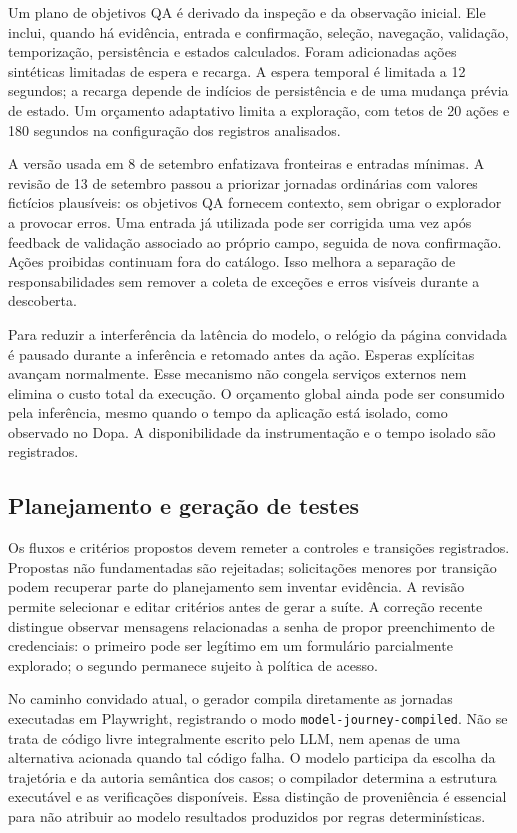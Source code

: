\documentclass[12pt]{article}
\begin{document}
Um plano de objetivos QA é derivado da inspeção e da observação inicial. Ele inclui, quando há evidência, entrada e confirmação, seleção, navegação, validação, temporização, persistência e estados calculados. Foram adicionadas ações sintéticas limitadas de espera e recarga. A espera temporal é limitada a 12 segundos; a recarga depende de indícios de persistência e de uma mudança prévia de estado. Um orçamento adaptativo limita a exploração, com tetos de 20 ações e 180 segundos na configuração dos registros analisados.

A versão usada em 8 de setembro enfatizava fronteiras e entradas mínimas. A revisão de 13 de setembro passou a priorizar jornadas ordinárias com valores fictícios plausíveis: os objetivos QA fornecem contexto, sem obrigar o explorador a provocar erros. Uma entrada já utilizada pode ser corrigida uma vez após feedback de validação associado ao próprio campo, seguida de nova confirmação. Ações proibidas continuam fora do catálogo. Isso melhora a separação de responsabilidades sem remover a coleta de exceções e erros visíveis durante a descoberta.

Para reduzir a interferência da latência do modelo, o relógio da página convidada é pausado durante a inferência e retomado antes da ação. Esperas explícitas avançam normalmente. Esse mecanismo não congela serviços externos nem elimina o custo total da execução. O orçamento global ainda pode ser consumido pela inferência, mesmo quando o tempo da aplicação está isolado, como observado no Dopa. A disponibilidade da instrumentação e o tempo isolado são registrados.

\subsection{Planejamento e geração de testes}
Os fluxos e critérios propostos devem remeter a controles e transições registrados. Propostas não fundamentadas são rejeitadas; solicitações menores por transição podem recuperar parte do planejamento sem inventar evidência. A revisão permite selecionar e editar critérios antes de gerar a suíte. A correção recente distingue observar mensagens relacionadas a senha de propor preenchimento de credenciais: o primeiro pode ser legítimo em um formulário parcialmente explorado; o segundo permanece sujeito à política de acesso.

No caminho convidado atual, o gerador compila diretamente as jornadas executadas em Playwright, registrando o modo \texttt{model-journey-compiled}. Não se trata de código livre integralmente escrito pelo LLM, nem apenas de uma alternativa acionada quando tal código falha. O modelo participa da escolha da trajetória e da autoria semântica dos casos; o compilador determina a estrutura executável e as verificações disponíveis. Essa distinção de proveniência é essencial para não atribuir ao modelo resultados produzidos por regras determinísticas.
\end{document}
